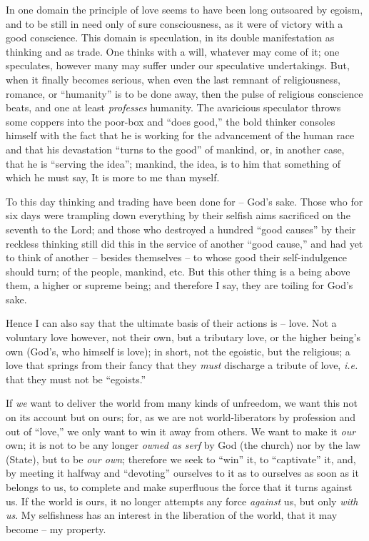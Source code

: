 In one domain the principle of love seems to have been long outsoared by 
egoism, and to be still in need only of sure consciousness, as it were of 
victory with a good conscience. This domain is speculation, in its double 
manifestation as thinking and as trade. One thinks with a will, whatever may 
come of it; one speculates, however many may suffer under our speculative 
undertakings. But, when it finally becomes serious, when even the last remnant 
of religiousness, romance, or ``humanity'' is to be done away, then the 
pulse of religious conscience beats, and one at least \textit{professes} 
humanity. The avaricious speculator throws some coppers into the poor-box and 
``does good,'' the bold thinker consoles himself with the fact that he is 
working for the advancement of the human race and that his devastation 
``turns to the good'' of mankind, or, in another case, that he is ``serving 
the idea''; mankind, the idea, is to him that something of which he must say, 
It is more to me than myself.

To this day thinking and trading have been done for -- God's sake. Those who 
for six days were trampling down everything by their selfish aims sacrificed 
on the seventh to the Lord; and those who destroyed a hundred ``good 
causes'' by their reckless thinking still did this in the service of another 
``good cause,'' and had yet to think of another -- besides themselves -- to 
whose good their self-indulgence should turn; of the people, mankind, etc. But 
this other thing is a being above them, a higher or supreme being; and 
therefore I say, they are toiling for God's sake.

Hence I can also say that the ultimate basis of their actions is -- love. Not 
a voluntary love however, not their own, but a tributary love, or the higher 
being's own (God's, who himself is love); in short, not the egoistic, but the 
religious; a love that springs from their fancy that they \textit{must} 
discharge a tribute of love, \textit{i.e.} that they must not be 
``egoists.''

If \textit{we} want to deliver the world from many kinds of unfreedom, we want 
this not on its account but on ours; for, as we are not world-liberators by 
profession and out of ``love,'' we only want to win it away from others. We 
want to make it \textit{our} own; it is not to be any longer \textit{owned as 
serf} by God (the church) nor by the law (State), but to be \textit{our own}; 
therefore we seek to ``win'' it, to ``captivate'' it, and, by meeting it 
halfway and ``devoting'' ourselves to it as to ourselves as soon as it 
belongs to us, to complete and make superfluous the force that it turns 
against us. If the world is ours, it no longer attempts any force 
\textit{against} us, but only \textit{with us}. My selfishness has an interest 
in the liberation of the world, that it may become -- my property.

